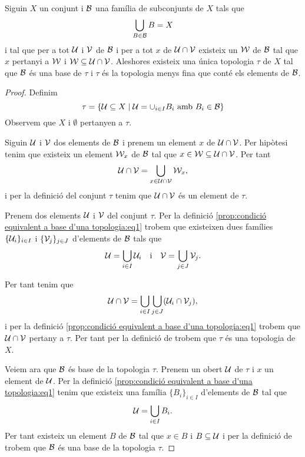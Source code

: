 \documentclass[../Apunts.tex]{subfiles}
\begin{document}
	\begin{proposition}
		\label{prop:condició equivalent a base d'una topologia}
		\label{prop:condició per que una topologia sigui la més fina que conté una base}
		Siguin \(X\) un conjunt i \(\mathcal{B}\) una família de subconjunts de \(X\) tals que
		\[\bigcup_{B\in\mathcal{B}}B=X\]
		i tal que per a tot \(\mathcal{U}\) i \(\mathcal{V}\) de \(\mathcal{B}\) i per a tot \(x\) de \(\mathcal{U}\cap\mathcal{V}\) existeix un \(\mathcal{W}\) de \(\mathcal{B}\) tal que \(x\) pertanyi a \(\mathcal{W}\) i \(\mathcal{W}\subseteq\mathcal{U}\cap\mathcal{V}\).	Aleshores existeix una única topologia \(\tau\) de \(X\) tal que \(\mathcal{B}\) és una base de \(\tau\) i \(\tau\) és la topologia menys fina que conté els elements de \(\mathcal{B}\).
		\begin{proof}
			Definim
			\begin{equation}
				\label{prop:condició equivalent a base d'una topologia:eq1}
				\tau=\left\{\obert{U}\subseteq X\mid\obert{U}=\cup_{i\in I}B_{i}\text{ amb }B_{i}\in\base{B}\right\}
			\end{equation}
			Observem que \(X\) i \(\emptyset\) pertanyen a \(\tau\).
			
			Siguin \(\mathcal{U}\) i \(\mathcal{V}\) dos elements de \(\mathcal{B}\) i prenem un element \(x\) de \(\mathcal{U}\cap\mathcal{V}\). Per hipòtesi tenim que existeix un element  \(\mathcal{W}_{x}\) de \(\mathcal{B}\) tal que \(x\in\mathcal{W}\subseteq\mathcal{U}\cap\mathcal{V}\). Per tant
			\[\mathcal{U}\cap\mathcal{V}=\bigcup_{x\in\mathcal{U}\cap\mathcal{V}}\mathcal{W}_{x},\]
			i per la definició del conjunt \(\tau\) tenim que \(\mathcal{U}\cap\mathcal{V}\) és un element de \(\tau\).
			
			Prenem dos elements \(\mathcal{U}\) i \(\mathcal{V}\) del conjunt \(\tau\). Per la definició \eqref{prop:condició equivalent a base d'una topologia:eq1} trobem que existeixen dues famílies \(\{\mathcal{U}_{i}\}_{i\in I}\) i \(\{\mathcal{V}_{j}\}_{j\in J}\) d'elements de \(\mathcal{B}\) tals que
			\[\mathcal{U}=\bigcup_{i\in I}\mathcal{U}_{i}\quad\text{i}\quad\mathcal{V}=\bigcup_{j\in J}\mathcal{V}_{j}.\]
			
			Per tant tenim que
			\[\mathcal{U}\cap\mathcal{V}=\bigcup_{i\in I}\bigcup_{j\in J}(\mathcal{U}_{i}\cap\mathcal{V}_{j}),\]
			i per la definició \eqref{prop:condició equivalent a base d'una topologia:eq1} trobem que \(\mathcal{U}\cap\mathcal{V}\) pertany a \(\tau\). Per tant per la definició de  trobem que \(\tau\) és una topologia de \(X\).
			
			Veiem ara que \(\mathcal{B}\) és base de la topologia \(\tau\). Prenem un obert \(\mathcal{U}\) de \(\tau\) i \(x\) un element de \(\mathcal{U}\). Per la definició \eqref{prop:condició equivalent a base d'una topologia:eq1} tenim que existeix una família \(\{B_{i}\}_{i\in I}\) d'elements de \(\mathcal{B}\) tal que
			\[\mathcal{U}=\bigcup_{i\in I}B_{i}.\]
			Per tant existeix un element \(B\) de \(\mathcal{B}\) tal que \(x\in B\) i \(B\subseteq\mathcal{U}\) i per la definició de  trobem que \(\mathcal{B}\) és una base de la topologia \(\tau\).
			

\end{proof}
\end{proposition}
\end{document}
